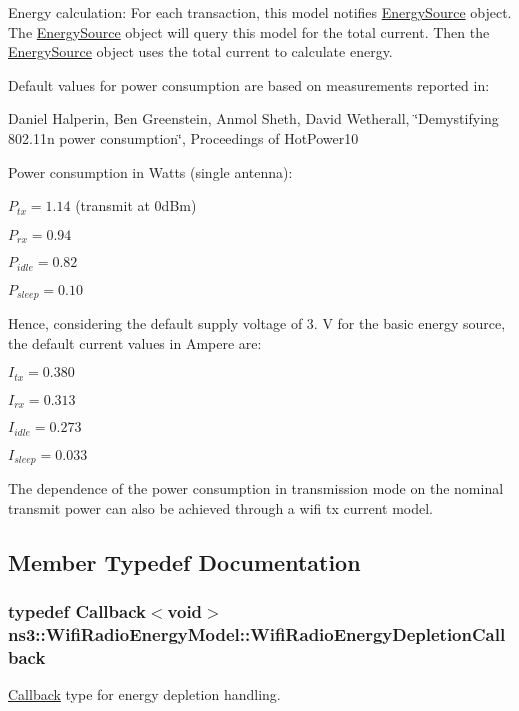 Energy calculation\+: For each transaction, this model notifies \hyperlink{classns3_1_1EnergySource}{Energy\+Source} object. The \hyperlink{classns3_1_1EnergySource}{Energy\+Source} object will query this model for the total current. Then the \hyperlink{classns3_1_1EnergySource}{Energy\+Source} object uses the total current to calculate energy.

Default values for power consumption are based on measurements reported in\+:

Daniel Halperin, Ben Greenstein, Anmol Sheth, David Wetherall, \char`\"{}\+Demystifying 802.\+11n power consumption\char`\"{}, Proceedings of Hot\+Power\textquotesingle{}10

Power consumption in Watts (single antenna)\+:

$ P_{tx} = 1.14 $ (transmit at 0d\+Bm)

$ P_{rx} = 0.94 $

$ P_{idle} = 0.82 $

$ P_{sleep} = 0.10 $

Hence, considering the default supply voltage of 3. V for the basic energy source, the default current values in Ampere are\+:

$ I_{tx} = 0.380 $

$ I_{rx} = 0.313 $

$ I_{idle} = 0.273 $

$ I_{sleep} = 0.033 $

The dependence of the power consumption in transmission mode on the nominal transmit power can also be achieved through a wifi tx current model. 

\subsection{Member Typedef Documentation}
\subsubsection[{\texorpdfstring{Wifi\+Radio\+Energy\+Depletion\+Callback}{WifiRadioEnergyDepletionCallback}}]{\setlength{\rightskip}{0pt plus 5cm}typedef {\bf Callback}$<$void$>$ {\bf ns3\+::\+Wifi\+Radio\+Energy\+Model\+::\+Wifi\+Radio\+Energy\+Depletion\+Callback}}\hypertarget{classns3_1_1WifiRadioEnergyModel_afdab2f5c9b565fd1ef7cf3fddd62ffab}{}\label{classns3_1_1WifiRadioEnergyModel_afdab2f5c9b565fd1ef7cf3fddd62ffab}
\hyperlink{classns3_1_1Callback}{Callback} type for energy depletion handling. 
